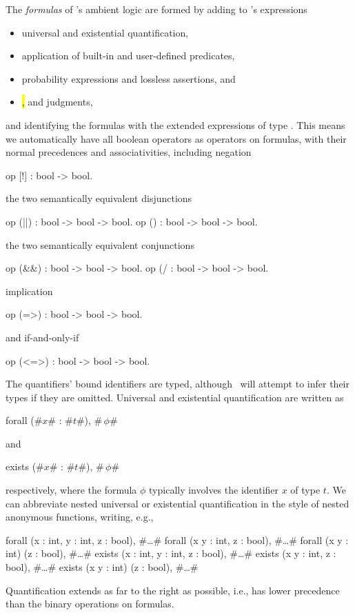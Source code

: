 The \emph{formulas} of \EasyCrypt's ambient logic are formed by
adding to \EasyCrypt's expressions
\begin{itemize}
\item universal and existential quantification,

\item application of built-in and user-defined predicates,

\item probability expressions and lossless assertions, and

\item \hl, \phl and \prhl judgments,
\end{itemize}
and identifying the formulas with the extended expressions of type
.
This means we automatically have all boolean operators as operators on
formulas, with their normal precedences and associativities, including
negation
\begin{easycrypt}{}{}
op [!] : bool -> bool.
\end{easycrypt}
the two semantically equivalent disjunctions
\begin{easycrypt}{}{}
op (||) : bool -> bool -> bool.
op (\/) : bool -> bool -> bool.
\end{easycrypt}
the two semantically equivalent conjunctions
\begin{easycrypt}{}{}
op (&&) : bool -> bool -> bool.
op (/\) : bool -> bool -> bool.
\end{easycrypt}
implication
\begin{easycrypt}{}{}
op (=>) : bool -> bool -> bool.
\end{easycrypt}
and if-and-only-if
\begin{easycrypt}{}{}
op (<=>) : bool -> bool -> bool.
\end{easycrypt}

The quantifiers' bound identifiers are typed, although \EasyCrypt\
will attempt to infer their types if they are omitted. Universal and
existential quantification are written as
\begin{easycrypt}{}{}
forall (#$x$# : #$t$#), #$\,\phi$#
\end{easycrypt}
and
\begin{easycrypt}{}{}
exists (#$x$# : #$t$#), #$\,\phi$#
\end{easycrypt}
respectively, where the formula $\phi$ typically involves the
identifier $x$ of type $t$. We can abbreviate nested universal or
existential quantification in the style of nested anonymous functions,
writing, e.g.,
\begin{easycrypt}{}{}
forall (x : int, y : int, z : bool), #\ldots#
forall (x y : int, z : bool), #\ldots#
forall (x y : int) (z : bool), #\ldots#
exists (x : int, y : int, z : bool), #\ldots#
exists (x y : int, z : bool), #\ldots#
exists (x y : int) (z : bool), #\ldots#
\end{easycrypt}
Quantification extends as far to the right as possible, i.e.,
has lower precedence than the binary operations on formulas.

